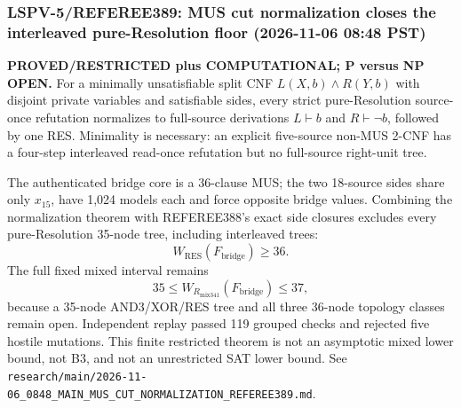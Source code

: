 \subsubsection*{LSPV-5/REFEREE389: MUS cut normalization closes the interleaved pure-Resolution floor (2026-11-06 08:48 PST)}

\textbf{PROVED/RESTRICTED plus COMPUTATIONAL; P versus NP OPEN.}
For a minimally unsatisfiable split CNF $L(X,b)\wedge R(Y,b)$ with disjoint private variables and satisfiable sides, every strict pure-Resolution source-once refutation normalizes to full-source derivations $L\vdash b$ and $R\vdash\neg b$, followed by one RES. Minimality is necessary: an explicit five-source non-MUS 2-CNF has a four-step interleaved read-once refutation but no full-source right-unit tree.

The authenticated bridge core is a 36-clause MUS; the two 18-source sides share only $x_{15}$, have 1,024 models each and force opposite bridge values. Combining the normalization theorem with REFEREE388's exact side closures excludes every pure-Resolution 35-node tree, including interleaved trees:
\[
  W_{\mathrm{RES}}(F_{\mathrm{bridge}})\ge36.
\]
The full fixed mixed interval remains
\[
  35\le W_{R_{\mathrm{mix341}}}(F_{\mathrm{bridge}})\le37,
\]
because a 35-node AND3/XOR/RES tree and all three 36-node topology classes remain open. Independent replay passed 119 grouped checks and rejected five hostile mutations. This finite restricted theorem is not an asymptotic mixed lower bound, not B3, and not an unrestricted SAT lower bound. See \texttt{research/main/2026-11-06\_0848\_MAIN\_MUS\_CUT\_NORMALIZATION\_REFEREE389.md}.
